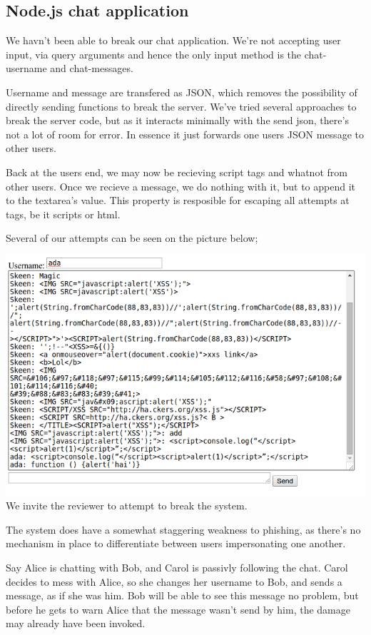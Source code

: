 \subsection*{Node.js chat application}
We havn't been able to break our chat application.
We're not accepting user input, via query arguments and hence the only input method is the chat-username and chat-messages.

Username and message are transfered as JSON, which removes the possibility of directly sending functions to break the server.
We've tried several approaches to break the server code, but as it interacts minimally with the send json, there's not a lot of room for error.
In essence it just forwards one users JSON message to other users.  

Back at the users end, we may now be recieving script tags and whatnot from other users.
Once we recieve a message, we do nothing with it, but to append it to the textarea's value.
This property is resposible for escaping all attempts at tags, be it scripts or html.

Several of our attempts can be seen on the picture below;

\includegraphics[width=\textwidth]{hoax.png}
We invite the reviewer to attempt to break the system.

The system does have a somewhat staggering weakness to phishing, as there's no mechanism in place to differentiate between users impersonating one another.

Say Alice is chatting with Bob, and Carol is passivly following the chat.
Carol decides to mess with Alice, so she changes her username to Bob, and sends a message, as if she was him.
Bob will be able to see this message no problem, but before he gets to warn Alice that the message wasn't send by him, the damage may already have been invoked.


